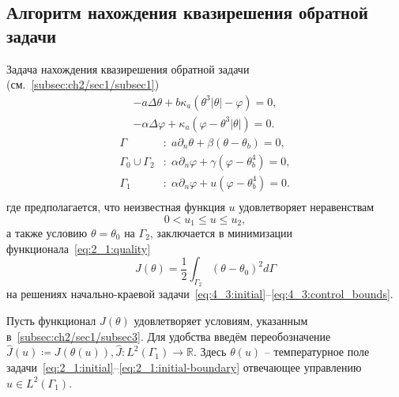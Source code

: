 \subsection{Алгоритм нахождения квазирешения обратной задачи}
\label{subsec:ch4/sec3/boundary}

Задача нахождения квазирешения обратной
задачи (см.~\ref{subsec:ch2/sec1/subsec1})
\begin{equation}
    \label{eq:4_3:initial}
    \begin{aligned}
        - a \Delta \theta + b \kappa_a(\theta ^ 3 | \theta | - \varphi) = 0,  \\
        - \alpha \Delta \varphi + \kappa_a (\varphi - \theta ^3 | \theta |) = 0.
    \end{aligned}
\end{equation}
\begin{equation}
    \label{eq:4_3:initial-boundary}
    \begin{aligned}
        \Gamma &: \; a \partial_n \theta + \beta (\theta - \theta _b) = 0, \\
        \Gamma_0 \cup \Gamma_2 &: \; \alpha \partial_n \varphi
        + \gamma(\varphi - \theta_b ^4 ) = 0, \\
        \Gamma_1 &: \; \alpha \partial_n \varphi + u(\varphi - \theta_b ^4 ) = 0. \\
    \end{aligned}
\end{equation}
где предполагается, что неизвестная функция $u$ удовлетворяет неравенствам
\begin{equation}
    \label{eq:4_3:control_bounds}
    0 < u_1 \leq u \leq u_2,
\end{equation}
а также условию $\theta = \theta_0$ на $\Gamma_2$,
заключается в минимизации функционала~\eqref{eq:2_1:quality}
\begin{equation}
    \label{eq:4_3:quality}
    J(\theta) = \frac{1}{2} \int_{\Gamma_2} (\theta - \theta_0)^2 d\Gamma
\end{equation}
на решениях начально-краевой задачи~\eqref{eq:4_3:initial}--\eqref{eq:4_3:control_bounds}.

Пусть функционал $J(\theta)$ удовлетворяет условиям,
указанным в~\autoref{subsec:ch2/sec1/subsec3}.
Для удобства введём переобозначение
$\hat{J}(u)\coloneqq J(\theta(u)), \hat{J}:L^2(\Gamma_1) \to \mathbb{R}$.
Здесь $\theta(u)$ -- температурное поле
задачи~\eqref{eq:2_1:initial}--\eqref{eq:2_1:initial-boundary}
отвечающее управлению $u \in L^2(\Gamma_1)$.

